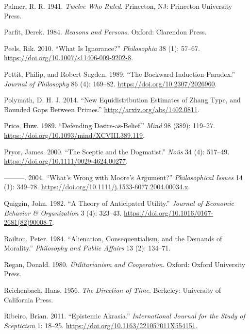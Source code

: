 \documentclass[
  10pt,
  letterpaper,
  twoside]{scrbook}
\newlength{\cslhangindent}
\newenvironment{CSLReferences}[2] %
 {\begin{list}{}{%
  \setlength{\itemindent}{0pt}
  \setlength{\leftmargin}{0pt}
  \setlength{\parsep}{0pt}
  \ifodd #1
   \setlength{\leftmargin}{\cslhangindent}
   \setlength{\itemindent}{-1\cslhangindent}
  \fi
  \setlength{\itemsep}{#2\baselineskip}}}
 {\end{list}}
\begin{document}
\begin{CSLReferences}{1}{0}
Palmer, R. R. 1941. \emph{Twelve Who Ruled}. Princeton, NJ: Princeton
University Press.

Parfit, Derek. 1984. \emph{Reasons and Persons}. Oxford: Clarendon
Press.

Peels, Rik. 2010. {``What Is Ignorance?''} \emph{Philosophia} 38 (1):
57--67. \url{https://doi.org/10.1007/s11406-009-9202-8}.

Pettit, Philip, and Robert Sugden. 1989. {``The Backward Induction
Paradox.''} \emph{Journal of Philosophy} 86 (4): 169--82.
\url{https://doi.org/10.2307/2026960}.

Polymath, D. H. J. 2014. {``New Equidistribution Estimates of Zhang
Type, and Bounded Gaps Between Primes.''}
\url{http://arxiv.org/abs/1402.0811}.

Price, Huw. 1989. {``Defending Desire-as-Belief.''} \emph{Mind} 98
(389): 119--27. \url{https://doi.org/10.1093/mind/XCVIII.389.119}.

Pryor, James. 2000. {``The Sceptic and the Dogmatist.''} \emph{No{û}s}
34 (4): 517--49. \url{https://doi.org/10.1111/0029-4624.00277}.

---------. 2004. {``What's Wrong with Moore's Argument?''}
\emph{Philosophical Issues} 14 (1): 349--78.
\url{https://doi.org/10.1111/j.1533-6077.2004.00034.x}.

Quiggin, John. 1982. {``A Theory of Anticipated Utility.''}
\emph{Journal of Economic Behavior \& Organization} 3 (4): 323--43.
\url{https://doi.org/10.1016/0167-2681(82)90008-7}.

Railton, Peter. 1984. {``Alienation, Consequentialism, and the Demands
of Morality.''} \emph{Philosophy and Public Affairs} 13 (2): 134--71.

Regan, Donald. 1980. \emph{Utilitarianism and Cooperation}. Oxford:
{O}xford {U}niversity {P}ress.

Reichenbach, Hans. 1956. \emph{The Direction of Time}. Berkeley:
University of California Press.

Ribeiro, Brian. 2011. {``Epistemic Akrasia.''} \emph{International
Journal for the Study of Scepticism} 1: 18--25.
\url{https://doi.org/10.1163/221057011X554151}.


\end{CSLReferences}
\end{document}
